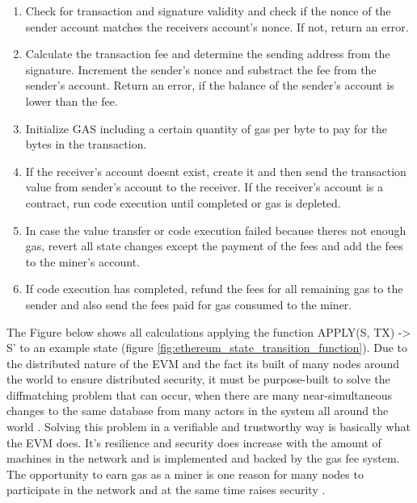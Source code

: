 \begin{enumerate}
	\item Check for transaction and signature validity and check if the nonce of the sender account matches the receivers account's nonce. If not, return an error.
	\item Calculate the transaction fee and determine the sending address from the signature. Increment the sender's nonce and substract the fee from the sender's account. Return an error, if the balance of the sender's account is lower than the fee.
	\item Initialize GAS including a certain quantity of gas per byte to pay for the bytes in the transaction.
	\item If the receiver's account doesnt exist, create it and then send the transaction value from sender's account to the receiver. If the receiver's account is a contract, run code execution until completed or gas is depleted.
	\item In case the value transfer or code execution failed because theres not enough gas, revert all state changes except the payment of the fees and add the fees to the miner's account.
	\item If code execution has completed, refund the fees for all remaining gas to the sender and also send the fees paid for gas consumed to the miner.
\end{enumerate}

The Figure below shows all calculations applying the function APPLY(S, TX) -> S' to an example state (figure \ref{fig:ethereum_state_transition_function}). Due to the distributed nature of the \ac{EVM} and the fact its built of many nodes around the world to ensure distributed security, it must be purpose-built to solve the diffmatching problem that can occur, when there are many near-simultaneous changes to the same database from many actors in the system all around the world \cite{diffmatch}. Solving this problem in a verifiable and trustworthy way is basically what the \ac{EVM} does. It's resilience and security does increase with the amount of machines in the network and is implemented and backed by the gas fee system. The opportunity to earn gas as a miner is one reason for many nodes to participate in the network and at the same time raises security \cite{dannen2017introducing}. \newline \newline

